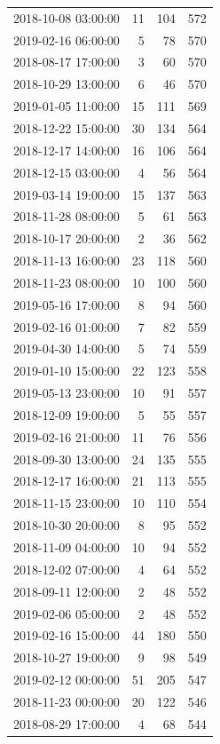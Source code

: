 \begin{tabular}{lrrr}
2018-10-08 03:00:00 & 11 & 104 & 572 \\
2019-02-16 06:00:00 & 5 & 78 & 570 \\
2018-08-17 17:00:00 & 3 & 60 & 570 \\
2018-10-29 13:00:00 & 6 & 46 & 570 \\
2019-01-05 11:00:00 & 15 & 111 & 569 \\
2018-12-22 15:00:00 & 30 & 134 & 564 \\
2018-12-17 14:00:00 & 16 & 106 & 564 \\
2018-12-15 03:00:00 & 4 & 56 & 564 \\
2019-03-14 19:00:00 & 15 & 137 & 563 \\
2018-11-28 08:00:00 & 5 & 61 & 563 \\
2018-10-17 20:00:00 & 2 & 36 & 562 \\
2018-11-13 16:00:00 & 23 & 118 & 560 \\
2018-11-23 08:00:00 & 10 & 100 & 560 \\
2019-05-16 17:00:00 & 8 & 94 & 560 \\
2019-02-16 01:00:00 & 7 & 82 & 559 \\
2019-04-30 14:00:00 & 5 & 74 & 559 \\
2019-01-10 15:00:00 & 22 & 123 & 558 \\
2019-05-13 23:00:00 & 10 & 91 & 557 \\
2018-12-09 19:00:00 & 5 & 55 & 557 \\
2019-02-16 21:00:00 & 11 & 76 & 556 \\
2018-09-30 13:00:00 & 24 & 135 & 555 \\
2018-12-17 16:00:00 & 21 & 113 & 555 \\
2018-11-15 23:00:00 & 10 & 110 & 554 \\
2018-10-30 20:00:00 & 8 & 95 & 552 \\
2018-11-09 04:00:00 & 10 & 94 & 552 \\
2018-12-02 07:00:00 & 4 & 64 & 552 \\
2018-09-11 12:00:00 & 2 & 48 & 552 \\
2019-02-06 05:00:00 & 2 & 48 & 552 \\
2019-02-16 15:00:00 & 44 & 180 & 550 \\
2018-10-27 19:00:00 & 9 & 98 & 549 \\
2019-02-12 00:00:00 & 51 & 205 & 547 \\
2018-11-23 00:00:00 & 20 & 122 & 546 \\
2018-08-29 17:00:00 & 4 & 68 & 544 \\

\end{tabular}
